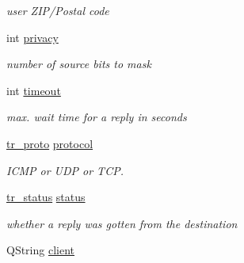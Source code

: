 \begin{CompactItemize}
\begin{CompactList}\small\item\em user ZIP/Postal code \item\end{CompactList}\item 
\hypertarget{classTraceroute_3f9381d554a035d23d119c72e8dc9296}{
int \hyperlink{classTraceroute_3f9381d554a035d23d119c72e8dc9296}{privacy}}
\label{classTraceroute_3f9381d554a035d23d119c72e8dc9296}

\begin{CompactList}\small\item\em number of source bits to mask \item\end{CompactList}\item 
\hypertarget{classTraceroute_4f5442fe67128f2532bf13c9db2c44af}{
int \hyperlink{classTraceroute_4f5442fe67128f2532bf13c9db2c44af}{timeout}}
\label{classTraceroute_4f5442fe67128f2532bf13c9db2c44af}

\begin{CompactList}\small\item\em max. wait time for a reply in seconds \item\end{CompactList}\item 
\hypertarget{classTraceroute_7194c3c5c34c2624008c3f5504d47074}{
\hyperlink{classTraceroute_9b1fb106e701234f6aa6e752413fe300}{tr\_\-proto} \hyperlink{classTraceroute_7194c3c5c34c2624008c3f5504d47074}{protocol}}
\label{classTraceroute_7194c3c5c34c2624008c3f5504d47074}

\begin{CompactList}\small\item\em ICMP or UDP or TCP. \item\end{CompactList}\item 
\hypertarget{classTraceroute_163e805026e031cb66d2030780f3fa56}{
\hyperlink{classTraceroute_dfccd360ace7950ed27e03705742fdc2}{tr\_\-status} \hyperlink{classTraceroute_163e805026e031cb66d2030780f3fa56}{status}}
\label{classTraceroute_163e805026e031cb66d2030780f3fa56}

\begin{CompactList}\small\item\em whether a reply was gotten from the destination \item\end{CompactList}\item 
\hypertarget{classTraceroute_7aa1123f1f57bcaccd62874a5fcaa126}{
QString \hyperlink{classTraceroute_7aa1123f1f57bcaccd62874a5fcaa126}{client}}
\label{classTraceroute_7aa1123f1f57bcaccd62874a5fcaa126}


\end{CompactItemize}
